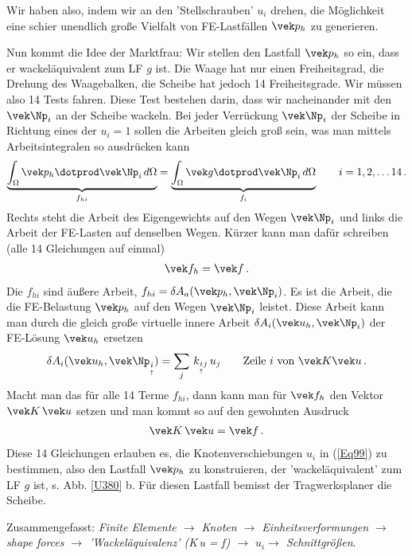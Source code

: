 {{Wir haben also, indem wir an den 'Stellschrauben' $u_i$ drehen, die M\"{o}glichkeit eine schier unendlich gro{\ss}e Vielfalt von FE-Lastf\"{a}llen $\vek p_h$ zu generieren.

Nun kommt die Idee der Marktfrau: Wir stellen den Lastfall $\vek p_h$ so ein, dass er wackel\"{a}quivalent zum LF $g$ ist. Die Waage hat nur einen Freiheitsgrad, die Drehung des Waagebalken, die Scheibe hat jedoch 14 Freiheitsgrade. Wir m\"{u}ssen also 14 Tests fahren. Diese Test bestehen darin, dass wir nacheinander mit den $\vek \Np_i$ an der Scheibe wackeln. Bei jeder Verr\"{u}ckung $\vek \Np_i$ der Scheibe in Richtung eines der $u_i = 1$ sollen die Arbeiten gleich gro{\ss} sein, was man mittels Arbeitsintegralen so ausdr\"{u}cken kann
\begin{align}
\underbrace{ \int_{\Omega} \vek p_h \dotprod  \vek \Np_i \,d\Omega}_{f_{hi}} = \underbrace{\int_{\Omega} \vek g \dotprod \vek \Np_i \,d\Omega}_{f_{i}} \qquad i = 1, 2, \ldots 14\,.
\end{align}
Rechts steht die Arbeit des Eigengewichts auf den Wegen $\vek \Np_i$ und links die Arbeit der FE-Lasten auf denselben Wegen. K\"{u}rzer kann man daf\"{u}r schreiben (alle 14 Gleichungen auf einmal)
\begin{align}
\vek f_h = \vek f\,.
\end{align}
Die $f_{hi}$ sind \"{a}u{\ss}ere Arbeit, $f_{hi} = \delta A_a(\vek p_h,\vek \Np_i)$. Es ist die Arbeit, die die FE-Belastung $\vek p_h$ auf den Wegen $\vek \Np_i$ leistet. Diese Arbeit kann man durch die gleich gro{\ss}e virtuelle innere Arbeit $\delta A_i(\vek u_h,\vek \Np_i)$ der FE-L\"{o}sung $\vek u_h$ ersetzen
\begin{align}
\delta A_i(\vek u_h,\vek \Np_{\underset{\uparrow}i}) = \sum_j\,k_{{\underset{\uparrow}i}j}\,u_j \qquad \text{Zeile $i$ von $\vek K\vek u$}\,.
\end{align}
Macht man das f\"{u}r alle 14 Terme $f_{hi}$, dann kann man f\"{u}r $\vek f_h$ den Vektor $\vek K\,\vek u$ setzen und man kommt so auf den gewohnten Ausdruck
\begin{align}
\vek K\,\vek u = \vek f\,.
\end{align}
Diese 14 Gleichungen erlauben es, die Knotenverschiebungen $u_i$ in (\ref{Eq99}) zu bestimmen, also den Lastfall $\vek p_h$ zu konstruieren, der 'wackel\"{a}quivalent' zum LF $g$ ist, s. Abb. \ref{U380} b. F\"{u}r diesen Lastfall bemisst der Tragwerksplaner die Scheibe.

Zusammengefasst: {\em Finite Elemente $ \rightarrow$ Knoten $ \rightarrow$ Einheitsverformungen $ \rightarrow$ shape forces $ \rightarrow$ 'Wackel\"{a}quivalenz' (\vek K\,\vek u = \vek f) $ \rightarrow$ $u_i$$ \rightarrow$ Schnittgr\"{o}{\ss}en\/}.


}}
